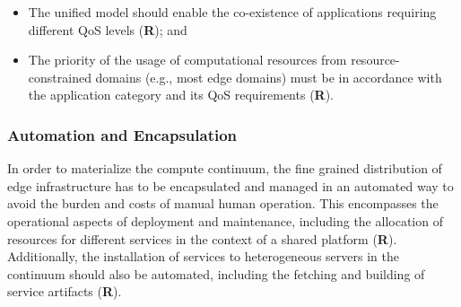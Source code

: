\begin{itemize}
	\item The unified model should enable the co-existence of applications requiring different QoS levels (\textbf{R}); and
	
	\item The priority of the usage of computational resources from resource-constrained domains (e.g., most edge domains) must be in accordance with the application category and its QoS requirements (\textbf{R}).
\end{itemize}


\subsubsection{Automation and Encapsulation}


In order to materialize the compute continuum, the fine grained distribution of edge infrastructure has to be encapsulated and managed in an automated way to avoid the burden and costs of manual human operation. This encompasses the operational aspects of deployment and maintenance, including the allocation of resources for different services in the context of a shared platform (\textbf{R}). 
Additionally, the installation of services to heterogeneous servers in the continuum should also be automated, including the fetching and building of service artifacts (\textbf{R}).









